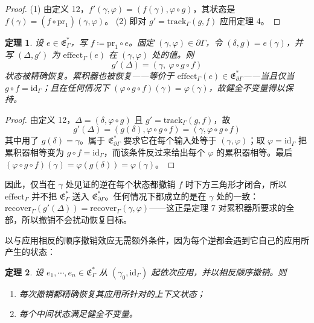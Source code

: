 \documentclass[11pt,a4paper]{article}
\theoremstyle{plain}
\newtheorem{theorem}{定理}
\theoremstyle{definition}
\theoremstyle{remark}
\begin{document}
\begin{proof}
(1) 由定义 12，$f'(\gamma, \varphi) = (f(\gamma), \varphi \circ g)$，其状态是 $f(\gamma) = (f \circ \mathrm{pr}_1)(\gamma, \varphi)$。
(2) 即对 $g' = \mathrm{track}_\Gamma(g, f)$ 应用定理 4。
\end{proof}

\begin{theorem}\label{thm:lifted-inverse}
设 $e \in \mathfrak{E}_\Gamma^\ast$，写 $f \coloneqq \mathrm{pr}_1 \circ e$。固定 $(\gamma, \varphi) \in \partial\Gamma$，令 $(\delta, g) = e(\gamma)$，并写 $(\Delta, g')$ 为 $\mathrm{effect}_\Gamma(e)$ 在 $(\gamma, \varphi)$ 处的值。则
\[
g'(\Delta) = (\gamma,\ \varphi \circ g \circ f) \tag{16}
\]
状态被精确恢复。累积器也被恢复——等价于 $\mathrm{effect}_\Gamma(e) \in \mathfrak{E}_{\partial\Gamma}^\ast$——当且仅当 $g \circ f = \mathrm{id}_\Gamma$；且在任何情况下 $(\varphi \circ g \circ f)(\gamma) = \varphi(\gamma)$，故健全不变量得以保持。
\end{theorem}

\begin{proof}
由定义 12，$\Delta = (\delta, \varphi \circ g)$ 且 $g' = \mathrm{track}_\Gamma(g, f)$，故
\[
g'(\Delta) = (g(\delta), \varphi \circ g \circ f) = (\gamma, \varphi \circ g \circ f)
\]
其中用了 $g(\delta) = \gamma$。属于 $\mathfrak{E}_{\partial\Gamma}^\ast$ 要求它在每个输入处等于 $(\gamma, \varphi)$；取 $\varphi = \mathrm{id}_\Gamma$ 把累积器相等变为 $g \circ f = \mathrm{id}_\Gamma$，而该条件反过来给出每个 $\varphi$ 的累积器相等。最后 $(\varphi \circ g \circ f)(\gamma) = \varphi(g(\delta)) = \varphi(\gamma)$。
\end{proof}

因此，仅当在 $\gamma$ 处见证的逆在每个状态都撤销 $f$ 时下方三角形才闭合，所以 $\mathrm{effect}_\Gamma$ 并不把 $\mathfrak{E}_\Gamma^\ast$ 送入 $\mathfrak{E}_{\partial\Gamma}^\ast$。任何情况下都成立的是在 $\gamma$ 处的一致：$\mathrm{recover}_\Gamma(g'(\Delta)) = \mathrm{recover}_\Gamma(\gamma, \varphi)$——这正是定理 7 对累积器所要求的全部，所以撤销不会扰动恢复目标。

以与应用相反的顺序撤销效应无需额外条件，因为每个逆都会遇到它自己的应用所产生的状态：

\begin{theorem}\label{thm:lifo-revert}
设 $e_1, \cdots, e_n \in \mathfrak{E}_\Gamma^\ast$ 从 $(\gamma_0, \mathrm{id}_\Gamma)$ 起依次应用，并以相反顺序撤销。则
\begin{enumerate}
\item 每次撤销都精确恢复其应用所针对的上下文状态；
\item 每个中间状态满足健全不变量。
\end{enumerate}
\end{theorem}
\end{document}

